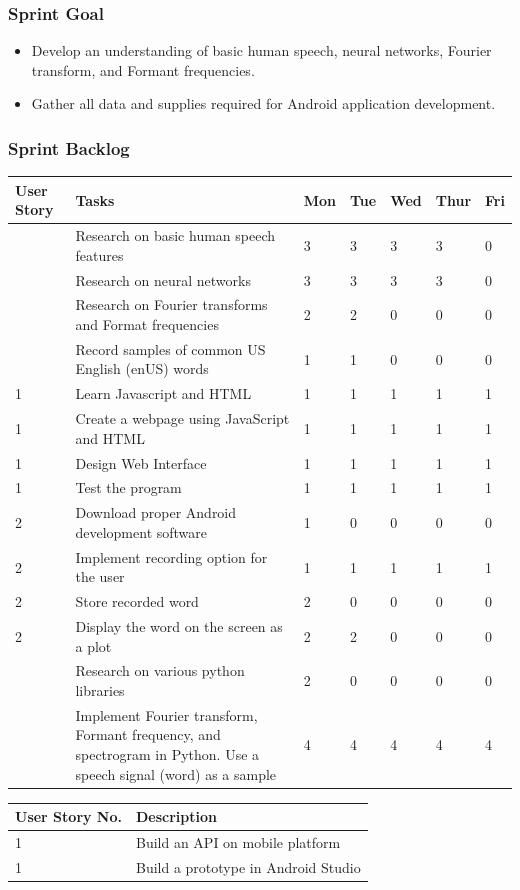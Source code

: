 \subsubsection{Sprint Goal}
\begin{itemize}
    \item  Develop an understanding of basic human speech, neural networks, Fourier transform, and Formant frequencies.
    \item  Gather all data and supplies required for Android application development.
\end{itemize}

\subsubsection{Sprint Backlog}
\begin{table}[htbp]
    \centering
    \begin{tabularx}{\textwidth}{l|l|l|l|l|l|l}
        User Story & Tasks &    Mon & Tue & Wed & Thur & Fri\\
        \hline
        & Research on basic human speech features & 3 & 3 & 3 & 3 & 0\\
        & Research on neural networks & 3 & 3 & 3 & 3 & 0\\
        & Research on Fourier transforms and Format frequencies & 2 & 2 & 0 & 0 & 0\\
        & Record samples of common US English (enUS) words & 1 & 1 & 0 & 0 & 0\\
        1 & Learn Javascript and HTML & 1 & 1 & 1 & 1 & 1\\
        1 & Create a webpage using JavaScript and HTML & 1 & 1 & 1 & 1 & 1\\
        1 & Design Web Interface & 1 & 1 & 1 & 1 & 1\\
        1 & Test the program & 1 & 1 & 1 & 1 & 1\\
        2 & Download proper Android development software & 1 & 0 & 0 & 0 & 0\\
        2 & Implement recording option for the user & 1 & 1 & 1 & 1 & 1\\
        2 & Store recorded word & 2 & 0 & 0 & 0 & 0\\
        2 & Display the word on the screen as a plot & 2 & 2 & 0 & 0 & 0\\
        & Research on various python libraries & 2 & 0 & 0 & 0 & 0\\
        & Implement Fourier transform, Formant frequency, and spectrogram in Python. Use a speech signal (word) as a sample & 4 & 4 & 4 & 4 & 4\\
    \end{tabularx}
\end{table}
\begin{table}[htbp]
    \centering
    \begin{tabularx}{\textwidth}{l|l}
        User Story No. & Description\\
        \hline
        1 & Build an API on mobile platform\\
        1 & Build a prototype in Android Studio\\
    \end{tabularx}
\end{table}


